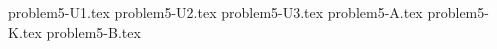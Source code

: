 \documentclass{article}
\begin{document}
{problem5-U1.tex}
{problem5-U2.tex}
{problem5-U3.tex}
{problem5-A.tex}
{problem5-K.tex}
{problem5-B.tex}
\end{document}
